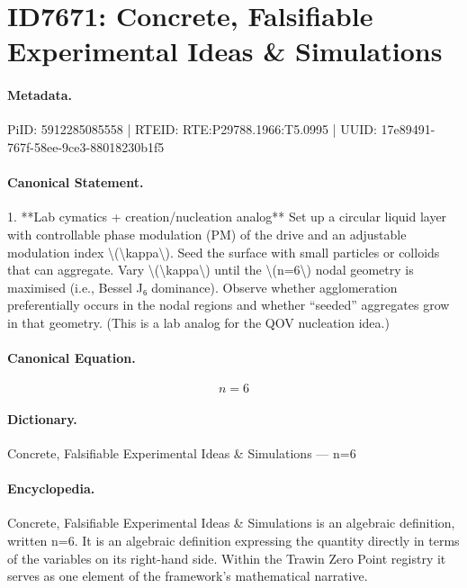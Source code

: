 \section*{ID7671: Concrete, Falsifiable Experimental Ideas \& Simulations}
\paragraph{Metadata.}
PiID: 5912285085558 | RTEID: RTE:P29788.1966:T5.0995 | UUID: 17e89491-767f-58ee-9ce3-88018230b1f5

\paragraph{Canonical Statement.}
1. **Lab cymatics + creation/nucleation analog** Set up a circular liquid layer with controllable phase modulation (PM) of the drive and an adjustable modulation index \textbackslash{}(\textbackslash{}kappa\textbackslash{}). Seed the surface with small particles or colloids that can aggregate. Vary \textbackslash{}(\textbackslash{}kappa\textbackslash{}) until the \textbackslash{}(n=6\textbackslash{}) nodal geometry is maximised (i.e., Bessel J₆ dominance). Observe whether agglomeration preferentially occurs in the nodal regions and whether “seeded” aggregates grow in that geometry. (This is a lab analog for the QOV nucleation idea.)

\paragraph{Canonical Equation.}
\[
n=6
\]

\paragraph{Dictionary.}
Concrete, Falsifiable Experimental Ideas \& Simulations — n=6

\paragraph{Encyclopedia.}
Concrete, Falsifiable Experimental Ideas \& Simulations is an algebraic definition, written n=6. It is an algebraic definition expressing the quantity directly in terms of the variables on its right-hand side. Within the Trawin Zero Point registry it serves as one element of the framework's mathematical narrative.
